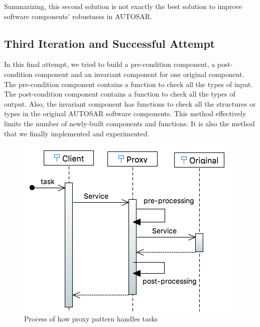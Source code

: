Summarizing, this second solution is not exactly the best solution to improve software components' robustness in AUTOSAR.



\subsection{Third Iteration and Successful Attempt}
In this final attempt, we tried to build a pre-condition component, a post-condition component and an invariant component for one original component. The pre-condition component contains a function to check all the types of input. The post-condition component contains a function to check all the types of output. Also, the invariant component has functions to check all the structures or types in the original AUTOSAR software components. This method effectively limits the number of newly-built components and functions. It is also the method that we finally implemented and experimented. 

\begin{figure}[b]
\centering
\includegraphics[width=.7\columnwidth]{figure/sequence1.png}
\caption{Process of how proxy pattern handles tasks}
\label{fig:proxyPattern}
\end{figure}


